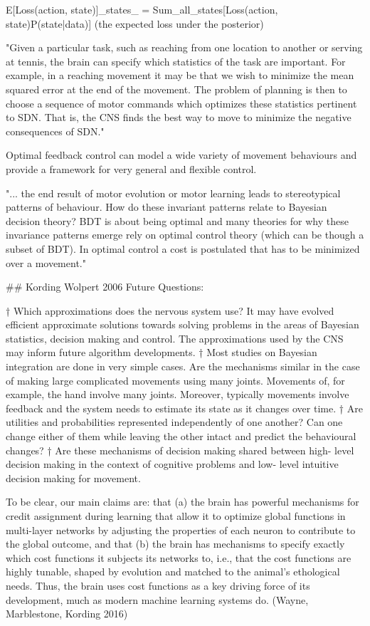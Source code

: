\documentclass[../main.tex]{subfiles}
\begin{document}
{{E[Loss(action, state)]_states_ = Sum_all_states[Loss(action, state)P(state|data)]
(the expected loss under the posterior)

"Given a particular task, such as reaching from one location to another or serving at tennis, the brain can specify which statistics of the task are important. For example, in a reaching movement it may be that we wish to minimize the mean squared error at the end of the movement. The problem of planning is then to choose a sequence of motor commands which optimizes these statistics pertinent to SDN. That is, the CNS finds the best way to move to minimize the negative consequences of SDN."

Optimal feedback control can model a wide variety of movement behaviours and provide a framework for very general and flexible control.

"... the end result of motor evolution or motor learning leads to stereotypical patterns of behaviour. How do these invariant patterns relate to Bayesian decision theory? BDT is about being optimal and many theories for why these invariance patterns emerge rely on optimal control theory (which can be though a subset of BDT). In optimal control a cost is postulated that has to be minimized over a movement."

## Kording Wolpert 2006 Future Questions:

† Which approximations does the nervous system use? It may have evolved efficient approximate solutions towards solving problems in the areas of Bayesian statistics, decision making and control. The approximations used by the CNS may inform future algorithm developments.
† Most studies on Bayesian integration are done in very simple cases. Are the mechanisms similar in the case of making large complicated movements using many joints. Movements of, for example, the hand involve many joints. Moreover, typically movements involve feedback and the system needs to estimate its state as it changes over time.
† Are utilities and probabilities represented independently of one another? Can one change either of them while leaving the other intact and predict the behavioural changes?
† Are these mechanisms of decision making shared between high- level decision making in the context of cognitive problems and low- level intuitive decision making for movement.

To be clear, our main claims are: that (a) the brain has powerful mechanisms for credit assignment during learning that allow it to optimize global functions in multi-layer networks by adjusting the properties of each neuron to contribute to the global outcome, and that (b) the brain has mechanisms to specify exactly which cost functions it subjects its networks to, i.e., that the cost functions are highly tunable, shaped by evolution and matched to the animal's ethological needs. Thus, the brain uses cost functions as a key driving force of its development, much as modern machine learning systems do. (Wayne, Marblestone, Kording 2016)

}}
\end{document}
